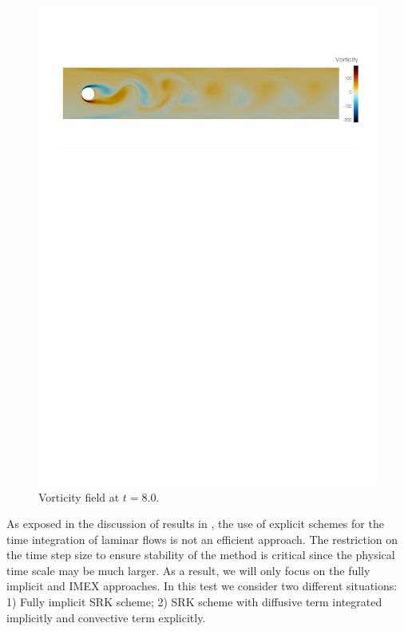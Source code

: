 \begin{figure}[h!]
  \centering
  \includegraphics[clip=true,trim=1.5cm 22.5cm 1cm 3cm,width=\textwidth]{Figures/Chapter6/cylinder/vorticity}
  \caption{Vorticity field at $t=8.0$.}
  \label{fig-Cyl_vorti}
\end{figure}

As exposed in the discussion of results in \cite{schafer_benchmark_1996}, the use of explicit schemes for the time integration of laminar flows is not an efficient approach. The restriction on the time step size to ensure stability of the method is critical since the physical time scale may be much larger. %
As a result, we will only focus on the fully implicit and IMEX approaches. In this test we consider two different situations: 1) Fully implicit SRK scheme; 2) SRK scheme with diffusive term integrated implicitly and convective term explicitly.

